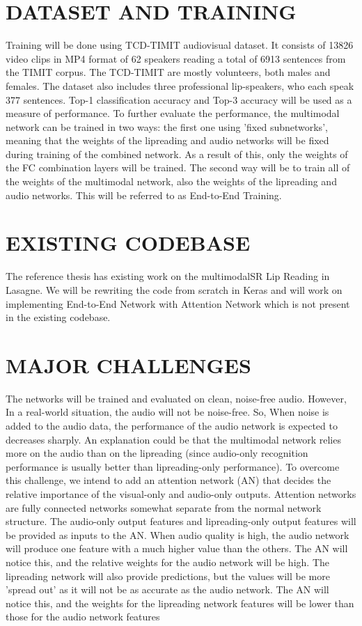\documentclass{article}
\begin{document}
\section{DATASET AND TRAINING}
Training will be done using TCD-TIMIT audiovisual dataset. It consists of 13826 video clips in MP4 format of 62 speakers reading a total of 6913 sentences from the TIMIT corpus. The TCD-TIMIT are mostly volunteers, both males and females. The dataset also includes three professional lip-speakers, who each speak 377 sentences. Top-1 classification accuracy and Top-3 accuracy will be used as a measure of performance. 
To further evaluate the performance, the multimodal network can be trained in two ways: the first one using ’fixed subnetworks’, meaning that the weights of the lipreading and audio networks will be fixed during training of the combined network. As a result of this, only the weights of the FC combination layers will be trained. The second way will be to train all of the weights of the multimodal network, also the weights of the lipreading and audio networks. This will be referred to as End-to-End Training.


\section{EXISTING CODEBASE}
The reference thesis has existing work on the multimodalSR Lip Reading in Lasagne. We will be rewriting the code from scratch in Keras and will work on implementing End-to-End Network with Attention Network which is not present in the existing codebase. 


\section{MAJOR CHALLENGES}
The networks will be trained and evaluated on clean, noise-free audio. However, In a real-world situation, the audio will not be noise-free. So, When noise is added to the audio data, the performance of the audio network is expected to decreases sharply. An explanation could be that the multimodal network relies more on the audio than on the lipreading (since audio-only recognition performance is usually better than lipreading-only performance). 
To overcome this challenge, we intend to add an attention network (AN) that decides the relative importance of the visual-only and audio-only outputs. Attention networks are fully connected networks somewhat separate from the normal network structure. The audio-only output features and lipreading-only output features will be provided as inputs to the AN. When audio quality is high, the audio network will produce one feature with a much higher value than the others. The AN will notice this, and the relative weights for the audio network will be high. The lipreading network will also provide predictions, but the values will be more ’spread out’ as it will not be as accurate as the audio network. The AN will notice this, and the weights for the lipreading network features will be lower than those for the audio network features
\end{document}
